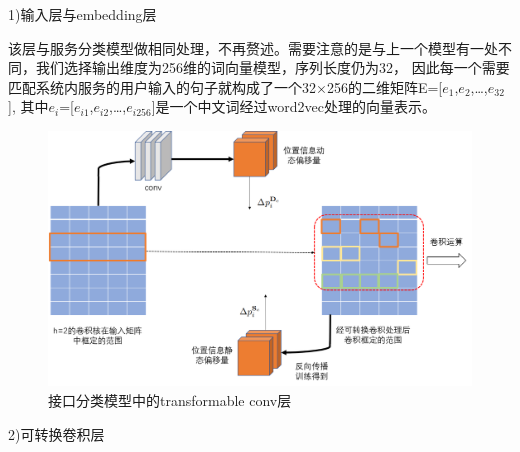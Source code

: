 1)输入层与embedding层

该层与服务分类模型做相同处理，不再赘述。需要注意的是与上一个模型有一处不同，我们选择输出维度为256维的词向量模型，序列长度仍为32，
因此每一个需要匹配系统内服务的用户输入的句子就构成了一个32×256的二维矩阵E=[$e_{1}$,$e_{2}$,\dots,$e_{32}$],
其中$e_{i}$=[$e_{i1}$,$e_{i2}$,\dots,$e_{i256}$]是一个中文词经过word2vec处理的向量表示。

\begin{figure}[htbp]
  \centering
  \includegraphics[scale=0.4]{./images/tansconv.jpg}
  \caption{接口分类模型中的transformable conv层}
  \label{fig:tansconv}
\end{figure}

2)可转换卷积层

